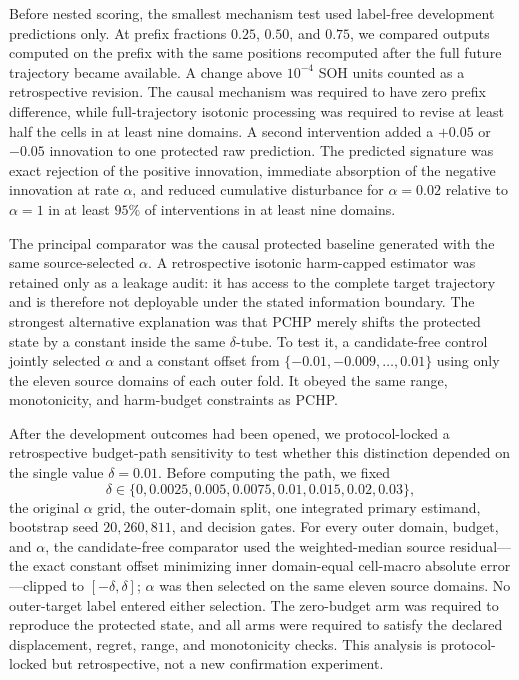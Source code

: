 \documentclass[11pt]{article}
\begin{document}
Before nested scoring, the smallest mechanism test used label-free development predictions only. At prefix fractions $0.25$, $0.50$, and $0.75$, we compared outputs computed on the prefix with the same positions recomputed after the full future trajectory became available. A change above $10^{-4}$ SOH units counted as a retrospective revision. The causal mechanism was required to have zero prefix difference, while full-trajectory isotonic processing was required to revise at least half the cells in at least nine domains. A second intervention added a $+0.05$ or $-0.05$ innovation to one protected raw prediction. The predicted signature was exact rejection of the positive innovation, immediate absorption of the negative innovation at rate $\alpha$, and reduced cumulative disturbance for $\alpha=0.02$ relative to $\alpha=1$ in at least $95\%$ of interventions in at least nine domains.

The principal comparator was the causal protected baseline generated with the same source-selected $\alpha$. A retrospective isotonic harm-capped estimator was retained only as a leakage audit: it has access to the complete target trajectory and is therefore not deployable under the stated information boundary. The strongest alternative explanation was that PCHP merely shifts the protected state by a constant inside the same $\delta$-tube. To test it, a candidate-free control jointly selected $\alpha$ and a constant offset from $\{-0.01,-0.009,\ldots,0.01\}$ using only the eleven source domains of each outer fold. It obeyed the same range, monotonicity, and harm-budget constraints as PCHP.

After the development outcomes had been opened, we protocol-locked a retrospective budget-path sensitivity to test whether this distinction depended on the single value $\delta=0.01$. Before computing the path, we fixed
\[
\delta\in\{0,0.0025,0.005,0.0075,0.01,0.015,0.02,0.03\},
\]
the original $\alpha$ grid, the outer-domain split, one integrated primary estimand, bootstrap seed $20{,}260{,}811$, and decision gates. For every outer domain, budget, and $\alpha$, the candidate-free comparator used the weighted-median source residual---the exact constant offset minimizing inner domain-equal cell-macro absolute error---clipped to $[-\delta,\delta]$; $\alpha$ was then selected on the same eleven source domains. No outer-target label entered either selection. The zero-budget arm was required to reproduce the protected state, and all arms were required to satisfy the declared displacement, regret, range, and monotonicity checks. This analysis is protocol-locked but retrospective, not a new confirmation experiment.
\end{document}
